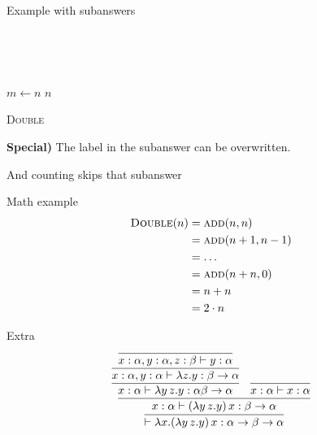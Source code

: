 \documentclass{exsheetans}  %
\begin{document}
\begin{subanswers}[7]{Example with subanswers}
    \item~\\
        \begin{center}
    \end{center}
    \item~\\
        \begin{minipage}{\linewidth}%
            \begin{algorithm}[H]
                $m \leftarrow n$\;
                \Return $n$\;
                \caption{\textsc{Double}}
            \end{algorithm}
        \end{minipage}
    \item[\textbf{Special)}] The label in the subanswer can be overwritten.
    \item And counting skips that subanswer
\end{subanswers}
\begin{answer}[4]{Math example}
    \begin{align*}
         \textsc{Double}(n) &= \textsc{add}(n,n)\\
                            &= \textsc{add}(n + 1, n-1)\\
                            &= \ldots\\
                            &= \textsc{add}(n + n, 0)\\
                            &= n + n\\
                            &= 2\cdot n
    \end{align*}
\end{answer}
\begin{supplement}[10]{Extra}
    \[\infer{\vdash \lambda x.(\lambda y\,z.y)\,x:\alpha\to\beta\to\alpha}{
            \infer{x:\alpha\vdash(\lambda y\,z.y)\,x:\beta\to\alpha}{
                  \infer{x:\alpha\vdash\lambda y\,z.y:\alpha\beta\to\alpha}{
                      \infer{x:\alpha,y:\alpha\vdash\lambda z.y:\beta\to\alpha}{
                          \infer{x:\alpha,y:\alpha,z:\beta\vdash y:\alpha}{}
                      }
                  }
                & \infer{x:\alpha\vdash x:\alpha}{}
            }
    }\]
\end{supplement}
\end{document}

